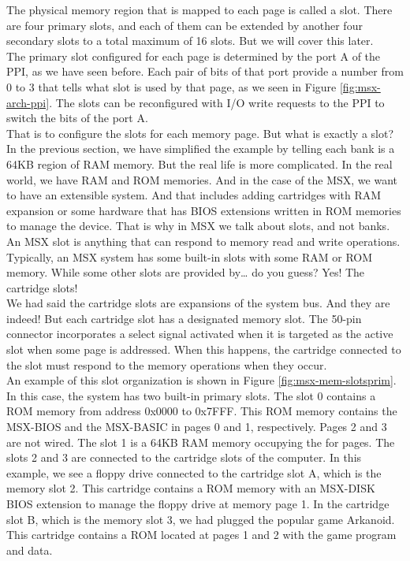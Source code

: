 The physical memory region that is mapped to each page is called a slot. There are four primary slots, and each of them can be extended by another four secondary slots to a total maximum of 16 slots. But we will cover this later. \\

The primary slot configured for each page is determined by the port A of the PPI, as we have seen before. Each pair of bits of that port provide a number from 0 to 3 that tells what slot is used by that page, as we seen in Figure \ref{fig:msx-arch-ppi}. The slots can be reconfigured with I/O write requests to the PPI to switch the bits of the port A. \\

That is to configure the slots for each memory page. But what is exactly a slot? In the previous section, we have simplified the example by telling each bank is a 64KB region of RAM memory. But the real life is more complicated. In the real world, we have RAM and ROM memories. And in the case of the MSX, we want to have an extensible system. And that includes adding cartridges with RAM expansion or some hardware that has BIOS extensions written in ROM memories to manage the device. That is why in MSX we talk about slots, and not banks. \\

An MSX slot is anything that can respond to memory read and write operations. Typically, an MSX system has some built-in slots with some RAM or ROM memory. While some other slots are provided by… do you guess? Yes! The cartridge slots! \\

We had said the cartridge slots are expansions of the system bus. And they are indeed! But each cartridge slot has a designated memory slot. The 50-pin connector incorporates a select signal activated when it is targeted as the active slot when some page is addressed. When this happens, the cartridge connected to the slot must respond to the memory operations when they occur.\\

An example of this slot organization is shown in Figure \ref{fig:msx-mem-slotsprim}. In this case, the system has two built-in primary slots. The slot 0 contains a ROM memory from address 0x0000 to 0x7FFF. This ROM memory contains the MSX-BIOS and the MSX-BASIC in pages 0 and 1, respectively. Pages 2 and 3 are not wired. The slot 1 is a 64KB RAM memory occupying the for pages. The slots 2 and 3 are connected to the cartridge slots of the computer. In this example, we see a floppy drive connected to the cartridge slot A, which is the memory slot 2. This cartridge contains a ROM memory with an MSX-DISK BIOS extension to manage the floppy drive at memory page 1. In the cartridge slot B, which is the memory slot 3, we had plugged the popular game Arkanoid. This cartridge contains a ROM located at pages 1 and 2 with the game program and data. \\

